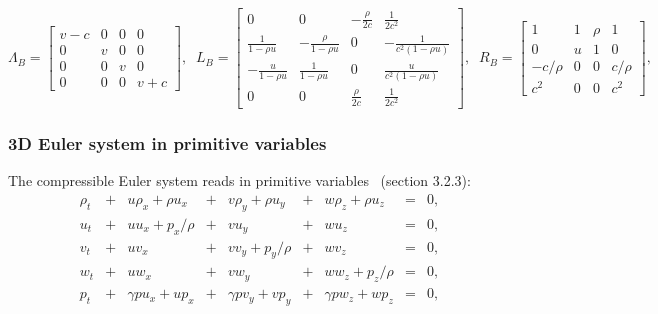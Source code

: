 \documentclass{article}
\begin{document}
\begin{equation}
  \Lambda_B = \left[
    \begin{array}{cccc}
      v-c& 0 & 0 & 0\\
      0  & v & 0 & 0\\
      0  & 0 & v & 0\\
      0  & 0 & 0 & v+c
    \end{array}
  \right],\;\;
  L_B = \left[
    \begin{array}{cccc}
      0                  & 0 &-\frac{\rho}{2c} & \frac{1}{2c^2}\\
      \frac{1}{1-\rho u} & -\frac{\rho}{1-\rho u} & 0 & -\frac{1}{c^2 (1-\rho u)}\\
     -\frac{u}{1-\rho u} &  \frac{1}{1-\rho u} & 0     &  \frac{u}{c^2 (1-\rho u)}\\
      0 & 0 & \frac{\rho}{2c} & \frac{1}{2c^2}
    \end{array}
  \right],\;\;
  R_B = \left[
    \begin{array}{cccc}
      1       & 1 & \rho & 1\\
      0       & u & 1    & 0\\
      -c/\rho & 0 & 0    & c/\rho\\
      c^2     & 0 & 0    & c^2
    \end{array}
  \right],\;\;
\end{equation}



\subsubsection*{3D Euler system in primitive variables}
The compressible Euler system reads in primitive variables~\cite{toro} (section 3.2.3):\\

\begin{equation}
  \begin{array}{ccccccccc}
    \rho_t & + & u\rho_x+\rho u_x & + & v\rho_y+\rho u_y & + & w\rho_z+\rho u_z & = &0,\\
    u_t    & + & u u_x + p_x/\rho & + & v u_y            & + & w u_z            & = &0,\\
    v_t    & + & u v_x            & + & v v_y + p_y/\rho & + & w v_z            & = &0,\\
    w_t    & + & u w_x            & + & v w_y            & + & w w_z + p_z/\rho & = &0,\\
    p_t    & + & \gamma p u_x + u p_x & + & \gamma p v_y + v p_y & + & \gamma p w_z + w p_z & = &0,
  \end{array}
\end{equation}
\end{document}
